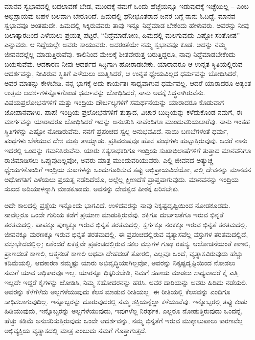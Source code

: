 ಮಾನವ ಸ್ವಭಾವದಲ್ಲಿ ಬದಲಾವಣೆ ಬೇಡ, ಮುಂದಕ್ಕೆ ನಮಗೆ ಒಂದು ಹೆಜ್ಜೆಯನ್ನೂ ಇಡುವುದಕ್ಕೆ ಇಚ್ಛೆಯಿಲ್ಲ – ಎಂಬ ಅಭಿಪ್ರಾಯವು ಬಹಳ ಬಲವಾಗಿ ಬೇರೂರಿದೆ. ಹಿಮದಲ್ಲಿ ಘನೀಭೂತರಾದ ಜನರ ಬಗ್ಗೆ ನಾನು ಓದಿದ್ದೆ. ಮಾನವ ಸ್ವಭಾವವೂ ಅಂತಹುದೇ. ಹಿಮದಲ್ಲಿ ಸಿಕ್ಕಿರುವವರು ತಾವು ಇನ್ನೂ ನಿದ್ದೆಮಾಡ ಬೇಕೆಂದು ಹೇಳುವರು. ಅವರನ್ನು ನೀವು ಬಲಾತ್ಕಾರದಿಂದ ಎಳೆಯಲು ಪ್ರಯತ್ನ ಪಟ್ಟರೆ, “ನಿದ್ದೆಮಾಡೋಣ, ಹಿಮದಲ್ಲಿ ಮಲಗುವುದು ಎಷ್ಟೋ ಸಂತೋಷ” ಎನ್ನುವರು. ಆ ನಿದ್ದೆಯಲ್ಲೇ ಅವರು ಸಾಯುವರು. ಅದರಂತೆಯೇ ನಮ್ಮ ಸ್ವಭಾವವೂ ಕೂಡ. ಅದನ್ನು ನಮ್ಮ ಜೀವನದಲ್ಲೆಲ್ಲ ಮಾಡುತ್ತಿರುವೆವು. ಕಾಲಿನಿಂದ ಮೇಲಕ್ಕೆ ಶೀತವೇರುತ್ತ ಬರುತ್ತಿದ್ದರೂ, ನಾವು ನಿದ್ದೆಮಾಡಬೇಕೆಂದು ಬಯಸುವೆವು. ಆದಕಾರಣ ನೀವು ಆದರ್ಶದ ಸಿದ್ಧಿಗಾಗಿ ಹೋರಾಡಬೇಕು. ಯಾರಾದರೂ ಆ ಉನ್ನತ ಸ್ಥಿತಿಯಲ್ಲಿರುವ ಆದರ್ಶವನ್ನು, ನೀವಿರುವ ಸ್ಥಿತಿಗೆ ಎಳೆಯಲು ಯತ್ನಿಸಿದರೆ, ಆ ಉನ್ನತ ಧ್ಯೇಯವಿಲ್ಲದ ಧರ್ಮವನ್ನು ಬೋಧಿಸಿದರೆ, ಅವರ ಮಾತನ್ನು ಕೇಳಬೇಡಿ. ನನ್ನ ಭಾಗಕ್ಕೆ ಅದು ಕಾರ್ಯತಃ ಸಾಧ್ಯವಾಗುವ ಧರ್ಮವಲ್ಲ. ಆದರೆ ಯಾರಾದರೂ ಅತ್ಯಂತ ಉತ್ತಮ ಆದರ್ಶಗಳನ್ನೊಳಗೊಂಡ ಧರ್ಮವನ್ನು ಬೋಧಿಸಿದರೆ, ನಾನು ಅದಕ್ಕೆ ಸಿದ್ಧನಾಗಿರುವೆನು. ವಿಷಯಪ್ರಲೋಭನಗಳಿಗೆ ಮತ್ತು ಇಂದ್ರಿಯ ದೌರ್ಬಲ್ಯಗಳಿಗೆ ಸಮರ್ಥನೆಯನ್ನು ಯಾರಾದರೂ ಕೊಡುವಾಗ ಜೋಪಾನವಾಗಿರಿ. ಪಾಪ! ಇಂದ್ರಿಯ ಪ್ರಲೋಭನಗಳಿಗೆ ತುತ್ತಾದ, ವಿಚಾರ ಬುದ್ಧಿಯನ್ನು ಕಳೆದುಕೊಂಡ ನಮಗೆ, ಈ ಮಾರ್ಗವನ್ನು ಯಾರಾದರೂ ಬೋಧಿಸಿದರೆ ಇದನ್ನು ಅನುಸರಿಸಿ ನಾವೆಂದಿಗೂ ಮುಂದುವರಿಯಲಾರೆವು. ನಾನು ಇಂತಹ ಸ್ಥಿತಿಗಳನ್ನು ಎಷ್ಟೋ ನೋಡಿರುವೆನು. ನನಗೆ ಪ್ರಪಂಚದ ಸ್ವಲ್ಪ ಅನುಭವವಿದೆ. ನಾಯಿ ಬಣಬೆಗಳಂತೆ ಧರ್ಮ, ಪಂಥಗಳು ಬೆಳೆಯುವ ದೇಶ ಮತ್ತು ತಾಯ್ನಾಡು. ಪ್ರತಿವರುಷವೂ ಹೊಸ ಪಂಥಗಳು ಹುಟ್ಟುತ್ತಿರುವುವು. ಆದರೆ ನಾನು ಇದರಲ್ಲಿ ಒಂದನ್ನು ಗಮನಿಸಿರುವೆನು. ಯಾರು ಸತ್ಯಸಾಧಕರಿಗೂ ಇಂದ್ರಿಯ ಸುಖಾಭಿಲಾಷೆಗಳಿಗೆ ತುತ್ತಾದ ಮಾನವನಿಗೂ ರಾಜಿಮಾಡಿಸಲು ಒಪ್ಪುವುದಿಲ್ಲವೋ, ಅವರು ಮಾತ್ರ ಮುಂದುವರಿಯುವರು. ಎಲ್ಲಿ ಜೀವನದ ಅತ್ಯುಚ್ಚ ಧ್ಯೇಯಗಳೊಂದಿಗೆ ಇಂದ್ರಿಯ ಸುಖಗಳನ್ನು ಒಂದುಗೂಡಿಸುವ ತಪ್ಪು ಅಭಿಪ್ರಾಯವಿದೆಯೋ, ಎಲ್ಲಿ ದೇವನನ್ನು ಮಾನವನ ಅಧೋಗತಿಗೆ ಎಳೆಯಲು ಪ್ರಯತ್ನ ನಡೆದಿದೆಯೊ, ಅಲ್ಲೆಲ್ಲ ಕ್ಷೀಣದೆಸೆ ಪ್ರಾಪ್ತವಾಗುವುದು. ಮಾನವನನ್ನು ಇಂದ್ರಿಯ ಸುಖದ ಅಡಿಯಾಳನ್ನಾಗಿ ಮಾಡಕೂಡದು. ಅವನನ್ನು ದೇವತ್ವದ ಪೀಠಕ್ಕೆ ಏರಿಸಬೇಕು. 

\vskip 9pt

ಅದೇ ಕಾಲದಲ್ಲಿ ಪ್ರಶ್ನೆಯ ಇನ್ನೊಂದು ಭಾಗವಿದೆ. ಉಳಿದವರನ್ನು ನಾವು ನಿಕೃಷ್ಟದೃಷ್ಟಿಯಿಂದ ನೋಡಕೂಡದು. ನಾವೆಲ್ಲರೂ ಒಂದೇ ಗುರಿಯ ಕಡೆಗೆ ಪ್ರಯಾಣ ಮಾಡುತ್ತಿರುವೆವು. ಶಕ್ತಿಗೂ ದುರ್ಬಲತೆಗೂ ಇರುವ ಭಿನ್ನತೆ ತರತಮದಲ್ಲಿ. ಪಾಪಕ್ಕೂ ಪುಣ್ಯಕ್ಕೂ ಇರುವ ಭಿನ್ನತೆ ತರತಮದಲ್ಲಿ. ಸ್ವರ್ಗಕ್ಕೂ ನರಕಕ್ಕೂ ಇರುವ ಭಿನ್ನತೆ ತರತಮದಲ್ಲಿ. ಜೀವನಕ್ಕೂ ಮರಣಕ್ಕೂ ಇರುವ ಭಿನ್ನತೆ ತರತಮದಲ್ಲಿ. ಈ ಪ್ರಪಂಚದಲ್ಲಿರುವ ವ್ಯತ್ಯಾಸವೆಲ್ಲ ವಸ್ತುಗಳ ತರತಮದಲ್ಲಿದೆ, ವಸ್ತುಭೇದದಲ್ಲಿಲ್ಲ; ಏಕೆಂದರೆ ಏಕತ್ವವೇ ಪ್ರಪಂಚದಲ್ಲಿರುವ ಸಕಲ ವಸ್ತುಗಳ ಗೂಢ ರಹಸ್ಯ. ಆಲೋಚನೆಯಂತೆ ಕಾಣಲಿ, ಪ್ರಾಣದಂತೆ ಕಾಣಲಿ, ಆತ್ಮನಂತೆ ಕಾಣಲಿ ಅಥವಾ ದೇಹದಂತೆ ತೋರಲಿ, ಎಲ್ಲವೂ ಒಂದೆ, ವ್ಯತ್ಯಾಸವಿರುವುದು ಹೆಚ್ಚು ಕಡಿಮೆಯಲ್ಲಿ. ಆದಕಾರಣ ನಮ್ಮಷ್ಟು ಯಾರು ಅಭಿವೃದ್ಧಿಯಾಗಿಲ್ಲವೋ, ಅವರನ್ನು ನಿಕೃಷ್ಟದೃಷ್ಟಿಯಿಂದ ನೋಡಲು ನಮಗೆ ಯಾವ ಅಧಿಕಾರವೂ ಇಲ್ಲ. ಯಾರನ್ನೂ ಧಿಕ್ಕರಿಸಬೇಡಿ, ನಿಮಗೆ ಸಹಾಯ ಮಾಡಲು ಸಾಧ್ಯವಾದರೆ ಕೈ ಎತ್ತಿ. ಇಲ್ಲದೇ ಇದ್ದರೆ ಕೈಗಳನ್ನು ಜೋಡಿಸಿ, ನಿಮ್ಮ ಸಹೋದರನನ್ನು ಹರಸಿ. ಅವರ ದಾರಿಯನ್ನು ಅವರು ಹಿಡಿದು ನಡೆಯಲಿ. ಅವರನ್ನು ಕೆಳೆಗೆಳೆದು ಅಲ್ಲಗಳೆಯುವುದು ಕೆಲಸ ಮಾಡುವ ರೀತಿಯಲ್ಲ. ಈ ರೀತಿಯಲ್ಲಿ ಕೆಲಸವನ್ನು ಎಂದಿಗೂ ಸಾಧಿಸಲಾಗುವುದಿಲ್ಲ. ಇನ್ನೊಬ್ಬರನ್ನು ದೂರುವುದರಲ್ಲಿ ನಮ್ಮ ಶಕ್ತಿಯನ್ನೆಲ್ಲಾ ಕಳೆಯುವೆವು. ಇನ್ನೊಬ್ಬರಲ್ಲಿ ತಪ್ಪು ಕಂಡು ಹಿಡಿಯುವುದು, ಇನ್ನೊಬ್ಬರನ್ನು ಅಲ್ಲಗೆಳೆಯುವುದು, ಇವುಗಳೆಲ್ಲ ನಿರರ್ಥಕ. ಎಲ್ಲರೂ ನೋಡುತ್ತಿರುವುದು ಒಂದನ್ನೆ, ಹೆಚ್ಚು ಕಡಿಮೆ ಅನುಸರಿಸುತ್ತಿರುವುದು ಒಂದೇ ಆದರ್ಶವನ್ನು, ನಮ್ಮ ಭಿನ್ನತೆಗೆ ಇರುವ ಮುಕ್ಕಾಲುಪಾಲು ಕಾರಣವೆಲ್ಲ ಅಭಿವ್ಯಕ್ತಿಯ ವ್ಯತ್ಯಾಸದಲ್ಲಿ ಮಾತ್ರ ಎಂಬುದು ನಮಗೆ ಗೊತ್ತಾಗುತ್ತದೆ. 

